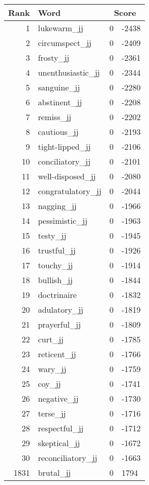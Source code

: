 \begin{longtable}[!htbp]{| rlr@{.}l |}
    \hline
    \textbf{Rank} & \textbf{Word} & \multicolumn{2}{c|}{\textbf{Score}} \\
    \hline
    \endhead
    1 & lukewarm\_jj & 0 & -2438 \\
    2 & circumspect\_jj & 0 & -2409 \\
    3 & frosty\_jj & 0 & -2361 \\
    4 & unenthusiastic\_jj & 0 & -2344 \\
    5 & sanguine\_jj & 0 & -2280 \\
    6 & abstinent\_jj & 0 & -2208 \\
    7 & remiss\_jj & 0 & -2202 \\
    8 & cautious\_jj & 0 & -2193 \\
    9 & tight-lipped\_jj & 0 & -2106 \\
    10 & conciliatory\_jj & 0 & -2101 \\
    11 & well-disposed\_jj & 0 & -2080 \\
    12 & congratulatory\_jj & 0 & -2044 \\
    13 & nagging\_jj & 0 & -1966 \\
    14 & pessimistic\_jj & 0 & -1963 \\
    15 & testy\_jj & 0 & -1945 \\
    16 & trustful\_jj & 0 & -1926 \\
    17 & touchy\_jj & 0 & -1914 \\
    18 & bullish\_jj & 0 & -1844 \\
    19 & doctrinaire & 0 & -1832 \\
    20 & adulatory\_jj & 0 & -1819 \\
    21 & prayerful\_jj & 0 & -1809 \\
    22 & curt\_jj & 0 & -1785 \\
    23 & reticent\_jj & 0 & -1766 \\
    24 & wary\_jj & 0 & -1759 \\
    25 & coy\_jj & 0 & -1741 \\
    26 & negative\_jj & 0 & -1730 \\
    27 & terse\_jj & 0 & -1716 \\
    28 & respectful\_jj & 0 & -1712 \\
    29 & skeptical\_jj & 0 & -1672 \\
    30 & reconciliatory\_jj & 0 & -1663 \\
    1831 & brutal\_jj & 0 & 1794 \\

\end{longtable}
